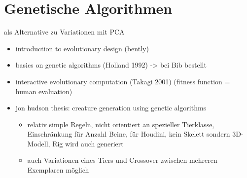 \section{Genetische Algorithmen}

als Alternative zu Variationen mit PCA

\begin{itemize}
 \item introduction to evolutionary design (bently)
 \item basics on genetic algorithms (Holland 1992) -> bei Bib bestellt
 \item interactive evolutionary computation (Takagi 2001) (fitness function = human evaluation)
 \item jon hudson thesis: creature generation using genetic algorithms \cite{JonHudson}
   \begin{itemize}
    \item relativ simple Regeln, nicht orientiert an spezieller Tierklasse, Einschränkung für Anzahl Beine, für Houdini, kein Skelett sondern 3D-Modell, Rig wird auch generiert
    \item auch Variationen eines Tiers und Crossover zwischen mehreren Exemplaren möglich
   \end{itemize}
\end{itemize}



